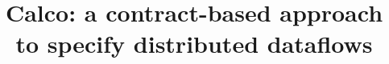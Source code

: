 \documentclass[sigconf]{acmart}
\theoremstyle{remark}
\begin{document}

\title{Calco: a contract-based approach to specify distributed dataflows}

\end{document}
